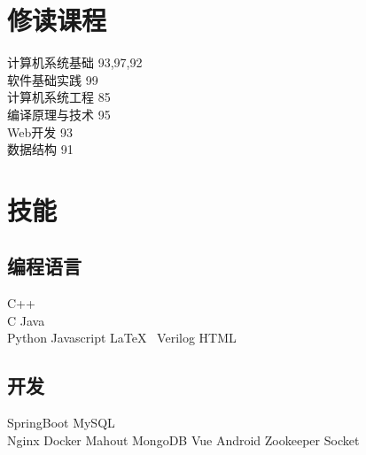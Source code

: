 \documentclass[]{deedy-resume-openfont}
\begin{document}
\begin{minipage}[t]{0.25\textwidth}
\section{修读课程}
\sectionsep
计算机系统基础 93,97,92 \\
软件基础实践 99\\
计算机系统工程 85 \\
编译原理与技术 95 \\
Web开发 93 \\
数据结构 91 \\
 \sectionsep
 \sectionsep

\section{技能}
\sectionsep
\subsection{编程语言}
C++ \\
C \textbullet{} Java \\
Python \textbullet{} Javascript \textbullet{} \LaTeX\ \textbullet{} Verilog \textbullet{} HTML \\ 
\sectionsep

\subsection{开发}
SpringBoot  \textbullet{} MySQL \\
Nginx \textbullet{} Docker \textbullet{} Mahout \textbullet{} MongoDB \textbullet{} Vue \textbullet{} Android \textbullet{} Zookeeper \textbullet{} Socket\\


%
%

\end{minipage} 
\hfill
\end{document}
